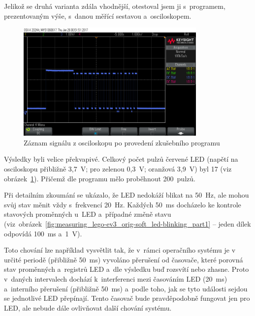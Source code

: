 Jelikož se druhá varianta zdála vhodnější, otestoval jsem ji s~programem, prezentovaným výše, s~danou měřící sestavou a~osciloskopem. 

\begin{figure}[h]
	\centering
	\includegraphics[width=350px]{images/measuring-oscilloscope_ev3-software_led-blinking_all.png}
	\caption[Záznam signálu z osciloskopu po provedení zkušebního programu]{Záznam signálu z osciloskopu po provedení zkušebního programu}
	\label{fig:measuring_lego-ev3_orig-soft_led-blinking_all}
\end{figure}

Výsledky byli velice překvapivé. Celkový počet pulzů červené LED (napětí na osciloskopu přibližně 3,7~V; pro zelenou 0,3~V; oranžová 3,9~V) byl 17 
(viz obrázek~\ref{fig:measuring_lego-ev3_orig-soft_led-blinking_all}). Přičemž dle programu mělo proběhnout 200~pulzů.  

Při detailním zkoumání se ukázalo, že LED nedokáží blikat na 50~Hz, ale mohou svůj stav měnit vždy s~frekvencí 20~Hz. 
Každých 50~ms docházelo ke kontrole stavových proměnných u~LED a~případné změně stavu (viz~obrázek~\ref{fig:measuring_lego-ev3_orig-soft_led-blinking_part1} -- jeden dílek odpovídá 100~ms a~1~V).


Toto chování lze například vysvětlit tak, že v~rámci operačního systému  je v určité periodě (přibližně 50~ms) vyvoláno přerušení od časovače, které porovná stav proměnných a~registrů LED a~dle výsledku buď rozsvítí nebo zhasne. 
Proto v~daných intervalech dochází k~interferenci mezi časováním LED (20~ms) a~interního přerušení (přibližně 50~ms) a~podle toho, jak se tyto události sejdou se jednotlivé LED přepínají.
Tento časovač bude pravděpodobně fungovat jen pro LED, ale nebude dále ovlivňovat další chování systému.
 
